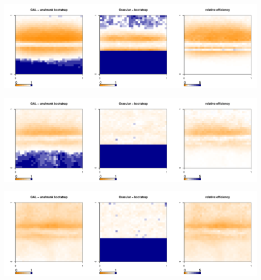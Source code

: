 \documentclass[authoryear, review, 11pt]{elsarticle}
\begin{document}
	\begin{center}
		\includegraphics[width=0.99\textwidth]{../../figures/X1-28-10.pdf}
		\label{fig:coveragemap10}
	\end{center}
        
	\begin{center}
		\includegraphics[width=0.99\textwidth]{../../figures/X1-28-11.pdf}
		\label{fig:coveragemap11}
	\end{center}
	
	\begin{center}
		\includegraphics[width=0.99\textwidth]{../../figures/X1-28-12.pdf}
		\label{fig:coveragemap12}
	\end{center}
	
\end{document}
